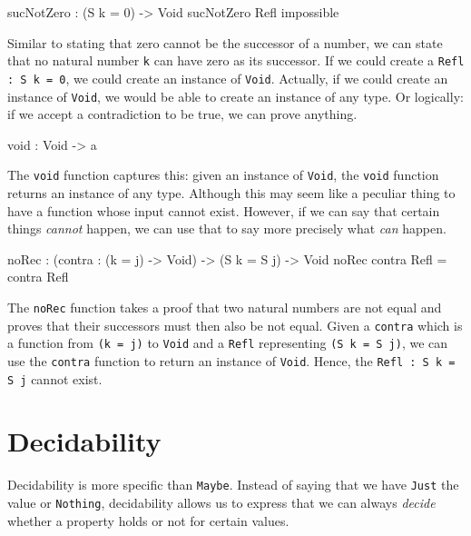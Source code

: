     \begin{code}[label={idr:snz}, caption={The successor of a natural number cannot be zero}]
            sucNotZero : (S k = 0) -> Void
            sucNotZero Refl impossible
    \end{code}
    Similar to stating that zero cannot be the successor of a number, we can state that no natural number \texttt{k} can have zero as its successor. If we could create a \texttt{Refl : S k = 0}, we could create an instance of \texttt{Void}. Actually, if we could create an instance of \texttt{Void}, we would be able to create an instance of any type. Or logically: if we accept a contradiction to be true, we can prove anything.


    \begin{code}[caption={The \texttt{void} function}]
            void : Void -> a
    \end{code}
    
    The \texttt{void} function captures this: given an instance of \texttt{Void}, the \texttt{void} function returns an instance of any type. Although this may seem like a peculiar thing to have a function whose input cannot exist. However, if we can say that certain things \textit{cannot} happen, we can use that to say more precisely what \textit{can} happen.
        
    \begin{code}[label={des:no-rec}, caption={Applying a function to an impossibility does not make it possible}]
            noRec : (contra : (k = j) -> Void) -> (S k = S j) -> Void
            noRec contra Refl = contra Refl
    \end{code}
        
    The \texttt{noRec} function takes a proof that two natural numbers are not equal and proves that their successors must then also be not equal. Given a \texttt{contra} which is a function from \texttt{(k = j)} to \texttt{Void} and a \texttt{Refl} representing \texttt{(S k = S j)}, we can use the \texttt{contra} function to return an instance of \texttt{Void}. Hence, the\linebreak
    \texttt{Refl : S k = S j} cannot exist.


\section{Decidability}
    Decidability is more specific than \texttt{Maybe}. Instead of saying that we have \texttt{Just} the value or \texttt{Nothing}, decidability allows us to express that we can always \textit{decide} whether a property holds or not for certain values.
        

